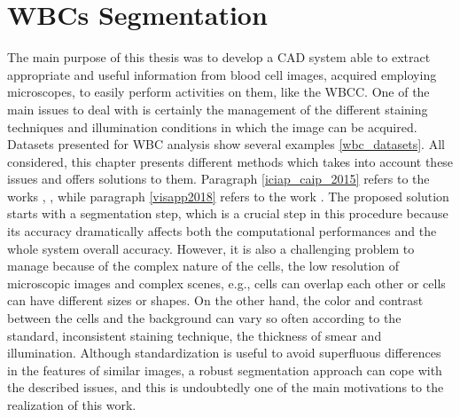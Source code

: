 \documentclass[final,a4paper,12pt,english]{UnicaPhdThesis3}
\begin{document}
{\chapter{WBCs Segmentation}
\label{wbcs_segmentation}
The main purpose of this thesis was to develop a CAD system able to extract appropriate and useful information from blood cell images, acquired employing microscopes, to easily perform activities on them, like the WBCC. One of the main issues to deal with is certainly the management of the different staining techniques and illumination conditions in which the image can be acquired. Datasets presented for WBC analysis show several examples \ref{wbc_datasets}.
All considered, this chapter presents different methods which takes into account these issues and offers solutions to them. Paragraph \ref{iciap_caip_2015} refers to the works \cite{Put15c}, \cite{Put15d}, while paragraph \ref{visapp2018} refers to the work \cite{Porcu}.
The proposed solution starts with a segmentation step, which is a crucial step in this procedure because its accuracy dramatically affects both the computational performances and the whole system overall accuracy. However, it is also a challenging problem to manage because of the complex nature of the cells, the low resolution of microscopic images and complex scenes, e.g., cells can overlap each other or cells can have different sizes or shapes. On the other hand, the color and contrast between the cells and the background can vary so often according to the standard, inconsistent staining technique, the thickness of smear and illumination. Although standardization is useful to avoid superfluous differences in the features of similar images, a robust segmentation approach can cope with the described issues, and this is undoubtedly one of the main motivations to the realization of this work.
}
\end{document}
